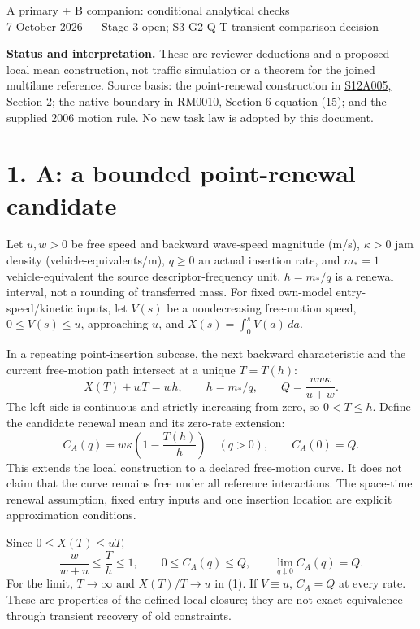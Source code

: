 \documentclass[11pt,a4paper]{article}
\begin{document}
{\Large A primary + B companion: conditional analytical checks}\\[4pt]
7 October 2026 --- Stage 3 open; S3-G2-Q-T transient-comparison decision

\textbf{Status and interpretation.} These are reviewer deductions and a
proposed local mean construction, not traffic simulation or a theorem for the
joined multilane reference. Source basis: the point-renewal construction in
\href{https://repository.tudelft.nl/file/File_c424c1b3-7374-436b-a6a7-abdf69063aa6}{S12A005, Section 2};
the native boundary in
\href{https://arxiv.org/pdf/1310.2660}{RM0010, Section 6 equation (15)};
and the supplied 2006 motion rule. No new task law is adopted by this document.

\section*{1. A: a bounded point-renewal candidate}
Let $u,w>0$ be free speed and backward wave-speed magnitude (m/s), $\kappa>0$
jam density (vehicle-equivalents/m), $q\ge0$ an actual insertion rate, and
$m_*=1$ vehicle-equivalent the source descriptor-frequency unit. $h=m_*/q$
is a renewal interval, not a rounding of transferred mass. For fixed own-model
entry-speed/kinetic inputs, let $V(s)$ be a nondecreasing free-motion speed,
$0\le V(s)\le u$, approaching $u$, and $X(s)=\int_0^s V(a)\,da$.

In a repeating point-insertion subcase, the next backward characteristic and
the current free-motion path intersect at a unique $T=T(h)$:
\begin{equation}
 X(T)+wT=wh,\qquad h=m_*/q,\qquad
 Q=\frac{uw\kappa}{u+w}.
\end{equation}
The left side is continuous and strictly increasing from zero, so
$0<T\le h$. Define the candidate renewal mean and its zero-rate extension:
\begin{equation}
 C_A(q)=w\kappa\left(1-\frac{T(h)}{h}\right)\quad(q>0),
 \qquad C_A(0)=Q.
\end{equation}
This extends the local construction to a declared free-motion curve. It does
not claim that the curve remains free under all reference interactions.
The space-time renewal assumption, fixed entry inputs and one insertion
location are explicit approximation conditions.

Since $0\le X(T)\le uT$,
\begin{equation}
 \frac{w}{w+u}\le\frac{T}{h}\le1,
 \qquad 0\le C_A(q)\le Q,\qquad
 \lim_{q\downarrow0}C_A(q)=Q.
\end{equation}
For the limit, $T\to\infty$ and $X(T)/T\to u$ in (1). If $V\equiv u$,
$C_A=Q$ at every rate. These are properties of the defined local closure;
they are not exact equivalence through transient recovery of old constraints.
\end{document}
